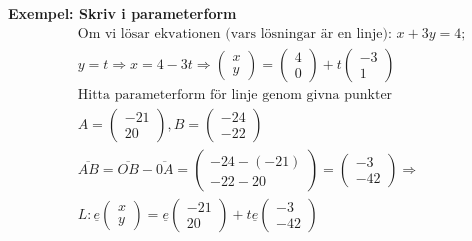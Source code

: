 \textbf{Exempel: Skriv i parameterform}
\begin{align*} 
  &\quad  \text{Om vi lösar ekvationen (vars lösningar är en linje): } x+3y=4; \\
  &\quad  y=t \Rightarrow x=4-3t \Rightarrow 
  \begin{pmatrix} x \\ y \end{pmatrix} =
  \begin{pmatrix} 4 \\ 0 \end{pmatrix} +
  t\begin{pmatrix} -3 \\ 1 \end{pmatrix} \\
  &\quad  \text{Hitta parameterform för linje genom givna punkter} \\
  &\quad 
  A= \begin{pmatrix} -21 \\ 20 \end{pmatrix},
  B= \begin{pmatrix} -24 \\ -22 \end{pmatrix} \\
  &\quad  \overline{AB} = \overline{OB}-\overline{0A} =
  \begin{pmatrix} -24-(-21) \\ -22-20 \end{pmatrix} =
  \begin{pmatrix} -3 \\ -42 \end{pmatrix} \Rightarrow \\
  &\quad  L:\underline{e}\begin{pmatrix} x \\ y \end{pmatrix} =
  \underline{e}\begin{pmatrix} -21 \\ 20 \end{pmatrix} +
  t\underline{e}\begin{pmatrix} -3 \\ -42 \end{pmatrix} \\
\end{align*}


